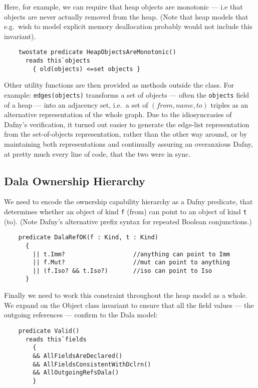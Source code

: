 Here, for example, we can require that heap objects are monotonic --- i.e that objects are never actually removed from the heap. (Note that heap models that e.g.\ wish to model explicit memory deallocation probably would not include this invariant).

\begin{lstlisting}
    twostate predicate HeapObjectsAreMonotonic() 
      reads this`objects
        { old(objects) <=set objects }
\end{lstlisting}


Other  utility functions are then provided as methods outside the class. For example: \lstinline+edges(objects)+ transforms a set of objects --- often the \lstinline+objects+ field of a heap --- into an adjacency set, i.e.\ a set of $(\textit{from},\textit{name},\textit{to})$ 
triples as an alternative representation of the whole graph.
Due to the idiosyncrasies of Dafny's verification, it turned out easier to generate the edge-list representation from the set-of-objects representation, rather than the other way around, or by maintaining both representations and continually assuring an overanxious Dafny, at pretty much every line of code, that the two were in sync.



\subsection{Dala Ownership Hierarchy}

We need to encode the ownership capability hierarchy as a Dafny predicate, that determines whether an object of kind \lstinline+f+ (from) can point to an object of kind \lstinline+t+ (to).  (Note Dafny's alternative prefix syntax for repeated Boolean conjunctions.)


\begin{lstlisting}
    predicate DalaRefOK(f : Kind, t : Kind)
      {
        || t.Imm?                   //anything can point to Imm
        || f.Mut?                   //mut can point to anything   
        || (f.Iso? && t.Iso?)       //iso can point to Iso
      }
\end{lstlisting}

Finally we need to work this constraint throughout the heap model as a whole. We expand on the Object class invariant to ensure that all the field values --- the outgoing references --- confirm to the Dala model:

\begin{lstlisting}
    predicate Valid()
      reads this`fields
        {
        && AllFieldsAreDeclared()
        && AllFieldsConsistentWithDclrn()
        && AllOutgoingRefsDala()
        }
\end{lstlisting}

